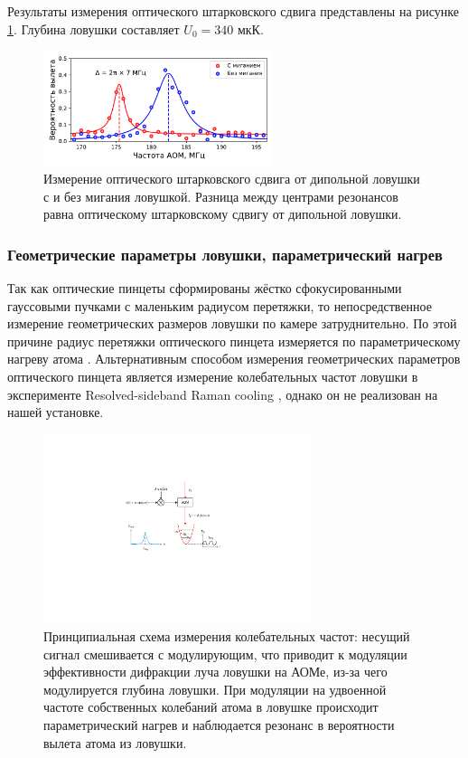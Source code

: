 Результаты измерения оптического штарковского сдвига представлены на рисунке \ref{fig:trap_depth}. Глубина ловушки составляет $U_0 = 340 \text{ мкК}$.

\begin{figure}[ht]
	\centering
	\includegraphics[width=0.6\textwidth]{images/trap_depth.pdf}
	\caption{Измерение оптического штарковского сдвига от дипольной ловушки с и без мигания ловушкой. Разница между центрами резонансов равна оптическому штарковскому сдвигу от дипольной ловушки.}
	\label{fig:trap_depth}
\end{figure}

\subsubsection{Геометрические параметры ловушки, параметрический нагрев}

Так как оптические пинцеты сформированы жёстко сфокусированными гауссовыми пучками с маленьким радиусом перетяжки, то непосредственное измерение геометрических размеров ловушки по камере затруднительно. По этой причине радиус перетяжки оптического пинцета измеряется по параметрическому нагреву атома \cite{Param_Heating_Friebel,Param_Heating_Savard,Param_Heating_Gardiner,J_uregui_2001}. Альтернативным способом измерения геометрических параметров оптического пинцета является измерение колебательных частот ловушки в эксперименте Resolved-sideband Raman cooling \cite{Kaufman_2012,Thompson_2013}, однако он не реализован на нашей установке. 

\begin{figure}[ht]
	\centering
	\includegraphics[width=0.7\textwidth]{images/parametric_heating.pdf}
	\caption{Принципиальная схема измерения колебательных частот: несущий сигнал смешивается с модулирующим, что приводит к модуляции эффективности дифракции луча ловушки на АОМе, из-за чего модулируется глубина ловушки. При модуляции на удвоенной частоте собственных колебаний атома в ловушке происходит параметрический нагрев и наблюдается резонанс в вероятности вылета атома из ловушки.}
	\label{fig:parametric_heating}
\end{figure}

